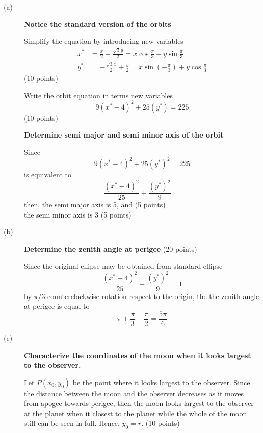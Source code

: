 \begin{description}
\item[(a)] \textbf{Notice the standard version of the orbits}

  Simplify the equation by introducing new variables
  \begin{align*}
    x^* &= \frac{x}{2} + \frac{\sqrt{3}y}{2}
      = x\cos\frac{\pi}{3} + y\sin\frac{\pi}{3} \\
    y^* &= -\frac{\sqrt{3}x}{2} + \frac{y}{2}
      = x\sin\left(-\frac{\pi}{3}\right) + y\cos\frac{\pi}{3}
  \end{align*}
  \hfill(10 points)

  Write the orbit equation in terms new variables %
  \[
    9(x^* - 4)^2 + 25(y^*) = 225 %
  \]
  \hfill(10 points)


  \textbf{Determine semi major and semi minor axis of the orbit}

  Since
  \[
    9(x^* - 4)^2 + 25(y^*)^2 = 225
  \]
  is equivalent to
  \[
    \frac{(x^* - 4)^2}{25} + \frac{(y^*)^2}{9} = %
  \]
  then, the semi major axis is 5, and \hfill(5 points) \\
  the semi minor axis is 3 \hfill(5 points)

\item[(b)] \textbf{Determine the zenith angle at perigee} \hfill(20 points)

  Since the original ellipse may be obtained from standard ellipse
  \[
    \frac{(x^* - 4)^2}{25} + \frac{(y^*)^2}{9} = 1
  \]
  by $\pi/3$ counterclockwise rotation respect to the origin, the the zenith %
  angle at perigee is equal to
  \[
    \pi + \frac{\pi}{3} - \frac{\pi}{2} = \frac{5\pi}{6}
  \]

\item[(c)] \textbf{Characterize the coordinates of the moon when it looks
  largest to the observer.}

  Let $P(x_0, y_0)$ be the point where it looks largest to the observer. Since
  the distance between the moon and the observer decreases as it moves from
  apogee towards perigee, then the moon looks largest to the observer at the
  planet when it closest to the planet while the whole of the moon still can
  be seen in full. Hence, $y_0 = r$. \hfill(10 points)


\end{description}
